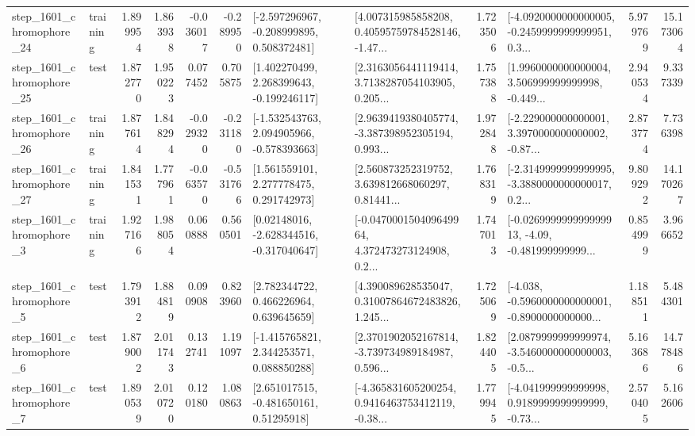 \begin{tabular}{llrrrrllrlrr}
 step\_1601\_chromophore\_24 &  training &      1.899954 &    1.863938 &     -0.036017 & -0.289950 &   [-2.597296967, -0.208999895, 0.508372481] &  [4.007315985858208, 0.40595759784528146, -1.47... &       1.723506 &  [-4.0920000000000005, -0.2459999999999951, 0.3... &            5.979769 &         15.173064 \\
 step\_1601\_chromophore\_25 &      test &      1.872770 &    1.950223 &      0.077452 &  0.705875 &    [1.402270499, 2.268399643, -0.199246117] &  [2.3163056441119414, 3.7138287054103905, 0.205... &       1.757388 &  [1.9960000000000004, 3.506999999999998, -0.449... &            2.940534 &          9.337339 \\
 step\_1601\_chromophore\_26 &  training &      1.877614 &    1.848294 &     -0.029320 & -0.231180 &   [-1.532543763, 2.094905966, -0.578393663] &  [2.9639419380405774, -3.387398952305194, 0.993... &       1.972848 &  [-2.229000000000001, 3.3970000000000002, -0.87... &            2.873774 &          7.736398 \\
 step\_1601\_chromophore\_27 &  training &      1.841531 &    1.777961 &     -0.063570 & -0.531766 &     [1.561559101, 2.277778475, 0.291742973] &  [2.560873252319752, 3.639812668060297, 0.81441... &       1.768319 &  [-2.3149999999999995, -3.3880000000000017, 0.2... &            9.809292 &         14.170267 \\
  step\_1601\_chromophore\_3 &  training &      1.927166 &    1.988054 &      0.060888 &  0.560501 &    [0.02148016, -2.628344516, -0.317040647] &  [-0.047000150409649964, 4.372473273124908, 0.2... &       1.747013 &  [-0.026999999999999913, -4.09, -0.481999999999... &            0.854999 &          3.966652 \\
  step\_1601\_chromophore\_5 &      test &      1.793912 &    1.884819 &      0.090908 &  0.823960 &     [2.782344722, 0.466226964, 0.639645659] &  [4.390089628535047, 0.31007864672483826, 1.245... &       1.725069 &  [-4.038, -0.5960000000000001, -0.8900000000000... &            1.188511 &          5.484301 \\
  step\_1601\_chromophore\_6 &      test &      1.879002 &    2.011743 &      0.132741 &  1.191097 &    [-1.415765821, 2.344253571, 0.088850288] &  [2.3701902052167814, -3.739734989184987, 0.596... &       1.824405 &  [2.0879999999999974, -3.5460000000000003, -0.5... &            5.163686 &         14.778486 \\
  step\_1601\_chromophore\_7 &      test &      1.890539 &    2.010720 &      0.120180 &  1.080863 &     [2.651017515, -0.481650161, 0.51295918] &  [-4.365831605200254, 0.9416463753412119, -0.38... &       1.779945 &  [-4.041999999999998, 0.9189999999999999, -0.73... &            2.570405 &          5.162606 \\

\end{tabular}
